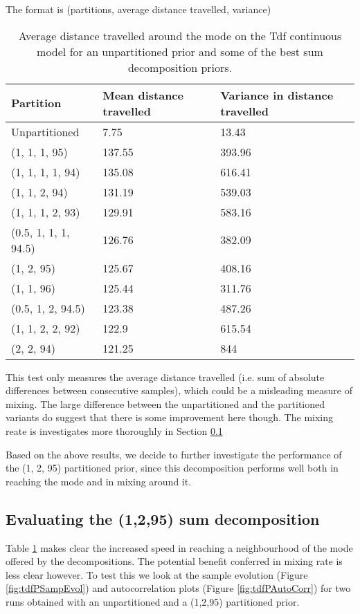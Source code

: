 The format is (partitions, average distance travelled, variance)

\begin{table}[h]
  \centering
  \begin{tabular}{lll}
    \toprule
    Partition & Mean distance travelled & Variance in distance travelled \\
    \midrule
    Unpartitioned & 7.75 & 13.43 \\
    (1, 1, 1, 95) & 137.55 & 393.96 \\
    (1, 1, 1, 1, 94) & 135.08 & 616.41 \\
    (1, 1, 2, 94) & 131.19 & 539.03 \\
    (1, 1, 1, 2, 93) & 129.91 & 583.16 \\
    (0.5, 1, 1, 1, 94.5) & 126.76 & 382.09 \\
    (1, 2, 95) & 125.67 & 408.16 \\
    (1, 1, 96) & 125.44 & 311.76 \\
    (0.5, 1, 2, 94.5) & 123.38 & 487.26 \\
    (1, 1, 2, 2, 92) & 122.9 & 615.54 \\
    (2, 2, 94) & 121.25 & 844 \\
    \bottomrule
  \end{tabular}
  \caption{Average distance travelled around the mode on the Tdf continuous model for an unpartitioned prior and some of the best sum decomposition priors.}
  \label{tab:bestParts}
\end{table}

This test only measures the average distance travelled (i.e. sum of absolute differences between consecutive samples), which could be a misleading measure of mixing. The large difference between the unpartitioned and the partitioned variants do suggest that there is some improvement here though. The mixing reate is investigates more thoroughly in Section \ref{sect:1295Eval}

Based on the above results, we decide to further investigate the performance of the (1, 2, 95) partitioned prior, since this decomposition performs well both in reaching the mode and in mixing around it.

\subsection{Evaluating the (1,2,95) sum decomposition}
\label{sect:1295Eval}

Table \ref{tab:bestParts} makes clear the increased speed in reaching a neighbourhood of the mode offered by the decompositions. The potential benefit conferred in mixing rate is less clear however. To test this we look at the sample evolution (Figure \ref{fig:tdfPSampEvol}) and autocorrelation plots (Figure \ref{fig:tdfPAutoCorr}) for two runs obtained with an unpartitioned and a (1,2,95) partitioned prior.

